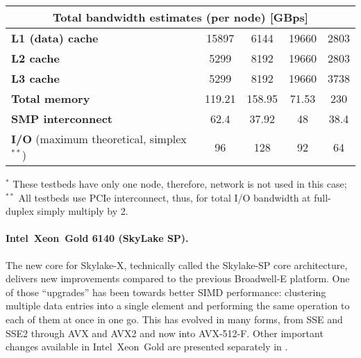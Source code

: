 \begin{table}
\begin{adjustbox}{width=1\textwidth}
\begin{tabular}{l|c|c|c|c|}
\multicolumn{5}{|c|}{Total bandwidth estimates (per node) [GBps]}  \\ \hline
\multicolumn{1}{|l|}{\textbf{L1 (data) cache}} & 15897 & 6144 & 19660 & 2803 \\ \hline
\multicolumn{1}{|l|}{\textbf{L2 cache}} & 5299 & 8192 & 19660 & 2803 \\ \hline
\multicolumn{1}{|l|}{\textbf{L3 cache}} & 5299 & 8192 & 19660 & 3738 \\ \hline
\multicolumn{1}{|l|}{\textbf{Total memory}} & 119.21 & 158.95 & 71.53 & 230 \\ \hline
\multicolumn{1}{|l|}{\textbf{SMP interconnect}} & 62.4 & 37.92 & 48 & 38.4 \\ \hline
\multicolumn{1}{|l|}{\textbf{I/O} (maximum theoretical, simplex$^{**}$)} & 96 & 128 & 92 & 64 \\ \hline
\end{tabular}
\end{adjustbox}
\newline
\raggedright{\footnotesize{
    $^*$ These testbeds have only one node, therefore, network is not used in this case;\\
    $^{**}$ All testbeds use PCIe interconnect, thus, for total I/O bandwidth at full-duplex simply multiply by 2.
}}
\end{table}

\paragraph{Intel\textregistered\ Xeon\textregistered\ Gold 6140 (SkyLake SP).}
The new core for Skylake-X, technically called the Skylake-SP core architecture, delivers new improvements compared to the previous Broadwell-E platform. One of those ``upgrades'' has been towards better SIMD performance: clustering multiple data entries into a single element and performing the same operation to each of them at once in one go. This has evolved in many forms, from SSE and SSE2 through AVX and AVX2 and now into AVX-512-F.
Other important changes available in Intel\textregistered\ Xeon\textregistered\ Gold are presented separately in \cite{INTELXEONGOLD6140}.

